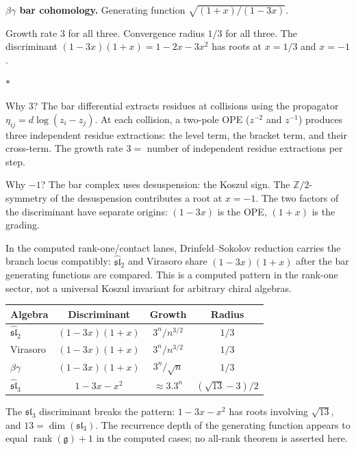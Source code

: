 \documentclass[11pt]{article}
\newcommand{\fg}{\mathfrak{g}}
\newcommand{\fsl}{\mathfrak{sl}}
\newcommand{\Z}{\mathbb{Z}}
\newcommand{\sep}{\bigskip\begin{center}$*$\end{center}\medskip}
\begin{document}
\medskip
\noindent\textbf{$\beta\gamma$ bar cohomology.}\enspace
Generating function $\sqrt{(1+x)/(1-3x)}$.

\medskip

Growth rate $3$ for all three.  Convergence radius $1/3$ for
all three.  The discriminant $(1-3x)(1+x) = 1-2x-3x^2$ has roots
at $x = 1/3$ and $x = -1$.

\sep

Why $3$?  The bar differential extracts residues at collisions
using the propagator $\eta_{ij} = d\log(z_i - z_j)$.  At each
collision, a two-pole OPE ($z^{-2}$ and $z^{-1}$) produces
three independent residue extractions: the level term, the
bracket term, and their cross-term.  The growth rate
$3 =$ number of independent residue extractions per step.

Why $-1$?  The bar complex uses desuspension: the Koszul sign.
The $\Z/2$-symmetry of the desuspension contributes a root at
$x = -1$.  The two factors of the discriminant have separate
origins: $(1-3x)$ is the OPE, $(1+x)$ is the grading.

In the computed rank-one/contact lanes, Drinfeld--Sokolov
reduction carries the branch locus compatibly:
$\widehat{\fsl}_2$ and Virasoro share $(1-3x)(1+x)$ after the
bar generating functions are compared.  This is a computed
pattern in the rank-one sector, not a universal Koszul invariant
for arbitrary chiral algebras.

\begin{center}
\small
\renewcommand{\arraystretch}{1.15}
\begin{tabular}{@{}lccc@{}}
\textbf{Algebra}
  & \textbf{Discriminant}
  & \textbf{Growth}
  & \textbf{Radius} \\
\hline
$\widehat{\fsl}_2$ & $(1-3x)(1+x)$ & $3^n/n^{3/2}$ & $1/3$ \\
Virasoro & $(1-3x)(1+x)$ & $3^n/n^{3/2}$ & $1/3$ \\
$\beta\gamma$ & $(1-3x)(1+x)$ & $3^n/\sqrt{n}$ & $1/3$ \\
$\widehat{\fsl}_3$ & $1-3x-x^2$ & $\approx 3.3^n$ & $(\sqrt{13}-3)/2$
\end{tabular}
\end{center}

\medskip

The $\fsl_3$ discriminant breaks the pattern:
$1 - 3x - x^2$ has roots involving $\sqrt{13}$, and
$13 = \dim(\fsl_3)$.  The recurrence depth of the generating
function appears to equal $\operatorname{rank}(\fg)+1$ in the
computed cases; no all-rank theorem is asserted here.
\end{document}

